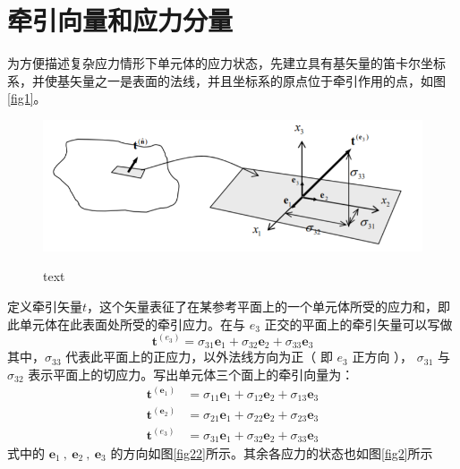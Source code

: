 \documentclass[12pt, a4paper]{ctexart}
\begin{document}
\section{牵引向量和应力分量}
为方便描述复杂应力情形下单元体的应力状态，先建立具有基矢量的笛卡尔坐标系，并使基矢量之一是表面的法线，并且坐标系的原点位于牵引作用的点，如图\ref{fig1}。
\begin{figure}[ht]
	\centering
	\includegraphics[scale=0.8]{21.png}
	\label{牵引向量的分解：应力分量}
	\caption{text}
\end{figure}
定义牵引矢量$ t $，这个矢量表征了在某参考平面上的一个单元体所受的应力和，即此单元体在此表面处所受的牵引应力。在与 $ e_3 $ 正交的平面上的牵引矢量可以写做
\begin{equation}
\mathbf{t}^{\left(e_{3}\right)}=\sigma_{31} \mathbf{e}_{1}+\sigma_{32} \mathbf{e}_{2}+\sigma_{33} \mathbf{e}_{3}
\end{equation}
其中，$ \sigma_{33} $ 代表此平面上的正应力，以外法线方向为正（ 即 $ e_3 $ 正方向 ）， $ \sigma_{31} $ 与 $ \sigma_{32} $ 表示平面上的切应力。写出单元体三个面上的牵引向量为：
\begin{equation} \label{eq1}
\begin{aligned} \mathbf{t}^{\left(\mathbf{e}_{1}\right)} &=\sigma_{11} \mathbf{e}_{1}+\sigma_{12} \mathbf{e}_{2}+\sigma_{13} \mathbf{e}_{3} \\ \mathbf{t}^{\left(\mathbf{e}_{2}\right)} &=\sigma_{21} \mathbf{e}_{1}+\sigma_{22} \mathbf{e}_{2}+\sigma_{23} \mathbf{e}_{3} \\ \mathbf{t}^{\left(e_{3}\right)} &=\sigma_{31} \mathbf{e}_{1}+\sigma_{32} \mathbf{e}_{2}+\sigma_{33} \mathbf{e}_{3} \end{aligned}
\end{equation}
式中的 $  \mathbf{e}_{1}~,~ \mathbf{e}_{2} ~,~ \mathbf{e}_{3} $ 的方向如图\ref{fig22}所示。其余各应力的状态也如图\ref{fig2}所示
\end{document}
